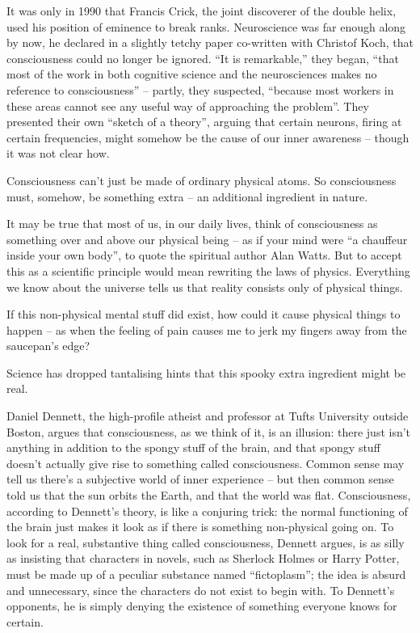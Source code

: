 \documentclass[
]{book}
\begin{document}
It was only in 1990 that Francis Crick, the joint discoverer of the double helix, used his position of eminence to break ranks. Neuroscience was far enough along by now, he declared in a slightly tetchy paper co-written with Christof Koch, that consciousness could no longer be ignored. ``It is remarkable,'' they began, ``that most of the work in both cognitive science and the neurosciences makes no reference to consciousness'' -- partly, they suspected, ``because most workers in these areas cannot see any useful way of approaching the problem''. They presented their own ``sketch of a theory'', arguing that certain neurons, firing at certain frequencies, might somehow be the cause of our inner awareness -- though it was not clear how.

Consciousness can't just be made of ordinary physical atoms. So consciousness must, somehow, be something extra -- an additional ingredient in nature.

It may be true that most of us, in our daily lives, think of consciousness as something over and above our physical being -- as if your mind were ``a chauffeur inside your own body'', to quote the spiritual author Alan Watts. But to accept this as a scientific principle would mean rewriting the laws of physics. Everything we know about the universe tells us that reality consists only of physical things.

If this non-physical mental stuff did exist, how could it cause physical things to happen -- as when the feeling of pain causes me to jerk my fingers away from the saucepan's edge?

Science has dropped tantalising hints that this spooky extra ingredient might be real.

Daniel Dennett, the high-profile atheist and professor at Tufts University outside Boston, argues that consciousness, as we think of it, is an illusion: there just isn't anything in addition to the spongy stuff of the brain, and that spongy stuff doesn't actually give rise to something called consciousness. Common sense may tell us there's a subjective world of inner experience -- but then common sense told us that the sun orbits the Earth, and that the world was flat. Consciousness, according to Dennett's theory, is like a conjuring trick: the normal functioning of the brain just makes it look as if there is something non-physical going on. To look for a real, substantive thing called consciousness, Dennett argues, is as silly as insisting that characters in novels, such as Sherlock Holmes or Harry Potter, must be made up of a peculiar substance named ``fictoplasm''; the idea is absurd and unnecessary, since the characters do not exist to begin with.
To Dennett's opponents, he is simply denying the existence of something everyone knows for certain.
\end{document}
